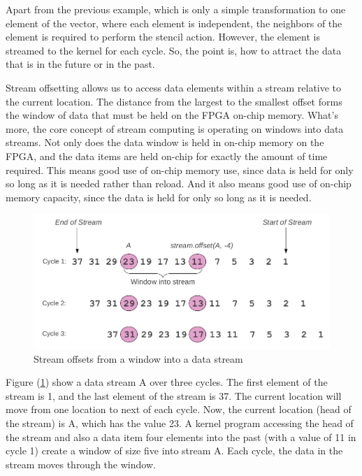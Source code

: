 Apart from the previous example, which is only a simple transformation to
one element of the vector, where each element is independent, the neighbors
of the element is required to perform the stencil action. However, the
element is streamed to the kernel for each cycle. So, the point is, how to
attract the data that is in the future or in the past.

Stream offsetting allows us to access data elements within a stream
relative to the current location\cite{maxcompiler_tutorial}. The distance
from the largest to the smallest offset forms the window of data that must
be held on the FPGA on-chip memory. What's more, the core concept of stream
computing is operating on windows into data streams. Not only does the data
window is held in on-chip memory on the FPGA, and the data items are held
on-chip for exactly the amount of time required. This means good use of
on-chip memory use, since data is held for only so long as it is needed
rather than reload. And it also means good use of on-chip memory capacity,
since the data is held for only so long as it is needed.

\begin{figure}
  \centering
  \includegraphics[scale=0.4]{img/window.png}
  \caption{Stream offsets from a window into a data stream}
  \label{fig:stream_window}
\end{figure}

Figure (\ref{fig:stream_window}) show a data stream A over three cycles.
The first element of the stream is 1, and the last element of the stream is
37. The current location will move from one location to next of each cycle.
Now, the current location (head of the stream) is A, which has the value
23. A kernel program accessing the head of the stream and also a data item
four elements into the past (with a value of 11 in cycle 1) create a window
of size five into stream A. Each cycle, the data in the stream moves
through the window.

